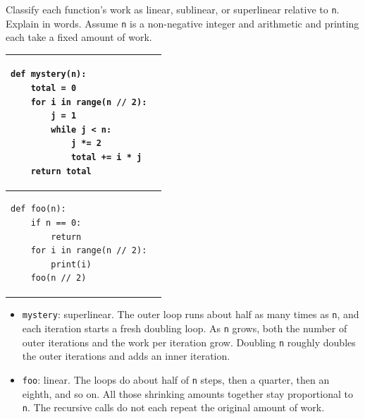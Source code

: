 \begin{blocksection}
\question Classify each function's work as linear, sublinear, or superlinear
relative to \lstinline{n}. Explain in words. Assume \lstinline{n} is a
non-negative integer and arithmetic and printing each take a fixed amount
of work.

\begin{center}
\begin{tabular}{ |p{13cm}|p{2cm}| }
\hline
\begin{lstlisting}
def mystery(n):
    total = 0
    for i in range(n // 2):
        j = 1
        while j < n:
            j *= 2
            total += i * j
    return total
\end{lstlisting} &  \\  \hline

\begin{lstlisting}
def foo(n):
    if n == 0:
        return
    for i in range(n // 2):
        print(i)
    foo(n // 2)
\end{lstlisting} &  \\  \hline
\end{tabular}
\end{center}

\end{blocksection}

\begin{solution}
\begin{itemize}
    \item \lstinline{mystery}: superlinear. The outer loop runs about half
    as many times as \lstinline{n}, and each iteration starts a fresh
    doubling loop. As \lstinline{n} grows, both the number of outer
    iterations and the work per iteration grow. Doubling \lstinline{n}
    roughly doubles the outer iterations and adds an inner iteration.
    \item \lstinline{foo}: linear. The loops do about half of \lstinline{n}
    steps, then a quarter, then an eighth, and so on. All those shrinking
    amounts together stay proportional to \lstinline{n}. The recursive
    calls do not each repeat the original amount of work.
\end{itemize}
\end{solution}

